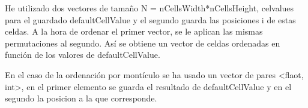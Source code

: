 He utilizado dos vectores de tamaño N = nCellsWidth*nCellsHeight, celvalues para el guardado defaultCellValue y el segundo guarda las posiciones i de estas celdas. A la hora de ordenar el primer vector, se le aplican las mismas permutaciones al segundo. Así se obtiene un vector de celdas ordenadas en función de los valores de defaultCellValue. 

En el caso de la ordenación por montículo se ha usado un vector de pares <flaot, int>, en el primer elemento se guarda el resultado de defaultCellValue y en el segundo la posicion a la que corresponde.
\vspace{5mm}
